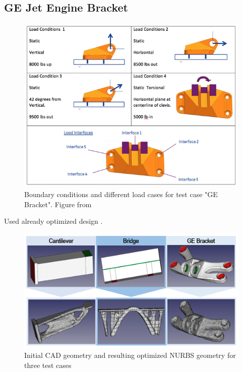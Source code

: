 \subsection{GE Jet Engine Bracket}
\begin{figure}[H]
\begin{center}
\includegraphics[scale = 0.6]{Pictures/GEbracket.png}
\end{center}
\caption{Boundary conditions and different load cases for test case "GE Bracket". Figure from \cite{GEBracket}}
\end{figure}
Used already optimized design \cite{GEBracketTripon}.

\begin{figure}
\begin{center}
\includegraphics[scale = 0.4]{Pictures/TestCases.png}
\end{center}
\caption{Initial CAD geometry and resulting optimized NURBS geometry for three test cases}
\end{figure}


